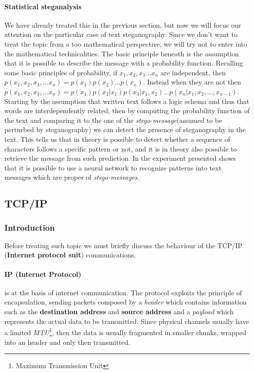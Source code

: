 \documentclass[../../main.tex]{subfiles}
\begin{document}
    \paragraph{Statistical steganalysis}
    We have already treated this in the previous section, but now we will focus
    our attention on the particular case of text steganography.
    Since we don't want to treat the topic from a too mathematical perspective,
    we will try not to enter into the mathematical technicalities.
    The basic principle beneath is the assumption that it is possible to
    describe the message with a probability function.
    Recalling some basic principles of probability, if
    $ x_1, x_2, x_3 \dots x_n $ are independent, then
    $ p(x_1, x_2, x_3, ... x_n) = p(x_1) p(x_2) \dots p(x_n)$. 
    Instead when they are not then
    $ p(x_1, x_2, x_3, ... x_n) = p(x_1) p(x_2 | x_1) p(x_3 | x_1, x_2) \dots
    p(x_n | x_1, x_2, \dots, x_{n-1})$.
    Starting by the assumption that written text follows a logic schema and thus
    that words are interdependently related, then by computing the probability
    function of the text and comparing it to the one of the
    \emph{stego-message}(assumed to be perturbed by steganography) we can detect
    the presence of steganography in the text. 
    This tells us that in theory is possible to detect whether a sequence of
    characters follows a specific pattern or not, and it is in theory also
    possible to retrieve the message from such prediction.
    In \cite{fast-steg-method} the experiment presented shows that it is
    possible to use a neural network to recognize patterns into text messages
    which are proper of \emph{stego-messages}.

    \subsection{TCP/IP}
    \subsubsection{Introduction}
    Before treating such topic we must briefly discuss the behaviour of the
    TCP/IP (\textbf{Internet protocol suit}) communications.
    
    \paragraph{IP (Internet Protocol)} is at the basis of internet
    communication. The protocol exploits the principle of encapsulation, sending
    packets composed by a \emph{header} which contains information such as the
    \textbf{destination address} and \textbf{source address} and a
    \emph{payload} which represents the actual data to be transmitted.
    Since physical channels usually have a limited \emph{MTU}\footnote{Maximum
    Transmission Unit}, then the data is usually fragmented in smaller chunks,
    wrapped into an header and only then transmitted.
    
\end{document}
